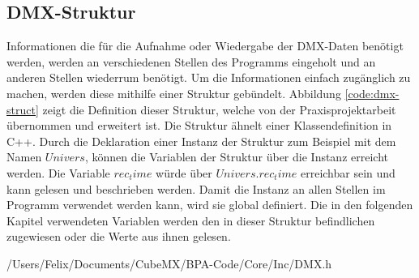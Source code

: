 
\subsection{DMX-Struktur}
\label{sec:dmx_struct}
Informationen die für die Aufnahme oder Wiedergabe der DMX-Daten benötigt werden, werden an verschiedenen Stellen des Programms eingeholt und an anderen Stellen wiederrum benötigt. Um die Informationen einfach zugänglich zu machen, werden diese mithilfe einer Struktur gebündelt. Abbildung \ref{code:dmx-struct} zeigt die Definition dieser Struktur, welche von der Praxisprojektarbeit übernommen und erweitert ist. Die Struktur ähnelt einer Klassendefinition in C++. Durch die Deklaration einer Instanz der Struktur zum Beispiel mit dem Namen $Univers$, können die Variablen der Struktur über die Instanz erreicht werden. Die Variable $rec_time$ würde über $Univers.rec_time$ erreichbar sein und kann gelesen und beschrieben werden. Damit die Instanz an allen Stellen im Programm verwendet werden kann, wird sie global definiert. Die in den folgenden Kapitel verwendeten Variablen werden den in dieser Struktur befindlichen zugewiesen oder die Werte aus ihnen gelesen.

{/Users/Felix/Documents/CubeMX/BPA-Code/Core/Inc/DMX.h}